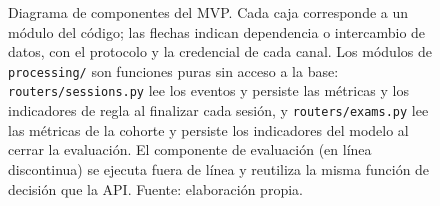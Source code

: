 \begin{figure}[p]
    \centering
    \resizebox{\textwidth}{!}{}
    \caption[Diagrama de componentes del MVP]{Diagrama de componentes del MVP. Cada caja corresponde a un módulo del código; las flechas indican dependencia o intercambio de datos, con el protocolo y la credencial de cada canal. Los módulos de \texttt{processing/} son funciones puras sin acceso a la base: \texttt{routers/sessions.py} lee los eventos y persiste las métricas y los indicadores de regla al finalizar cada sesión, y \texttt{routers/exams.py} lee las métricas de la cohorte y persiste los indicadores del modelo al cerrar la evaluación. El componente de evaluación (en línea discontinua) se ejecuta fuera de línea y reutiliza la misma función de decisión que la API. Fuente: elaboración propia.}
    \label{fig:diag_componentes}
\end{figure}

